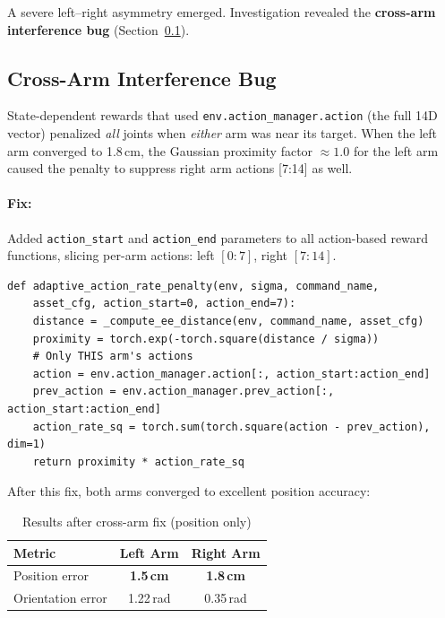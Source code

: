 \documentclass[11pt,a4paper]{article}
\begin{document}
\noindent A severe left--right asymmetry emerged. Investigation revealed the \textbf{cross-arm interference bug} (Section~\ref{sec:cross_arm}).

\subsection{Cross-Arm Interference Bug}
\label{sec:cross_arm}
State-dependent rewards that used \texttt{env.action\_manager.action} (the full 14D vector) penalized \emph{all} joints when \emph{either} arm was near its target. When the left arm converged to 1.8\,cm, the Gaussian proximity factor $\approx 1.0$ for the left arm caused the penalty to suppress right arm actions [7:14] as well.

\paragraph{Fix:} Added \texttt{action\_start} and \texttt{action\_end} parameters to all action-based reward functions, slicing per-arm actions: left $[0:7]$, right $[7:14]$.

\begin{lstlisting}[caption={Per-arm action isolation in reward functions},label={lst:per_arm}]
def adaptive_action_rate_penalty(env, sigma, command_name,
    asset_cfg, action_start=0, action_end=7):
    distance = _compute_ee_distance(env, command_name, asset_cfg)
    proximity = torch.exp(-torch.square(distance / sigma))
    # Only THIS arm's actions
    action = env.action_manager.action[:, action_start:action_end]
    prev_action = env.action_manager.prev_action[:, action_start:action_end]
    action_rate_sq = torch.sum(torch.square(action - prev_action), dim=1)
    return proximity * action_rate_sq
\end{lstlisting}

\noindent After this fix, both arms converged to excellent position accuracy:

\begin{table}[H]
\centering
\caption{Results after cross-arm fix (position only)}
\begin{tabular}{@{}lcc@{}}
\toprule
\textbf{Metric} & \textbf{Left Arm} & \textbf{Right Arm} \\
\midrule
Position error & \textbf{1.5\,cm} & \textbf{1.8\,cm} \\
Orientation error & 1.22\,rad & 0.35\,rad \\
\bottomrule
\end{tabular}
\end{table}
\end{document}
